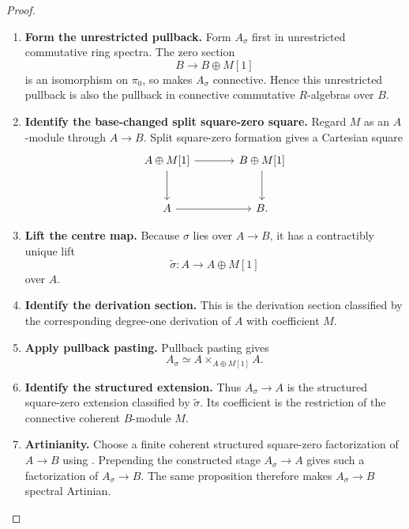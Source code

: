 \begin{proof}
\leavevmode
\begin{enumerate}[label=\textup{(\arabic*)}]
    \item \textbf{Form the unrestricted pullback.}
    Form \(A_\sigma\) first in unrestricted commutative ring spectra. The zero
    section
    \[
        B\longrightarrow B\oplus M[1]
    \]
    is an isomorphism on \(\pi_0\), so
     makes \(A_\sigma\) connective.
    Hence this unrestricted pullback is also the pullback in connective
    commutative \(R\)-algebras over \(B\).
    \item \textbf{Identify the base-changed split square-zero square.}
    Regard \(M\) as an \(A\)-module through \(A\to B\). Split square-zero
    formation gives a Cartesian square
    \[
    \begin{tikzcd}[column sep=large, row sep=large]
        A\oplus M[1] \arrow[r] \arrow[d]
            & B\oplus M[1] \arrow[d]
        \\
        A \arrow[r]
            & B.
    \end{tikzcd}
    \]
    \item \textbf{Lift the centre map.}
    Because \(\sigma\) lies over \(A\to B\), it has a contractibly unique lift
    \[
        \widetilde\sigma:A\longrightarrow A\oplus M[1]
    \]
    over \(A\).
    \item \textbf{Identify the derivation section.}
    This is the derivation section classified by the corresponding
    degree-one derivation of \(A\) with coefficient \(M\).
    \item \textbf{Apply pullback pasting.}
    Pullback pasting gives
    \[
        A_\sigma
        \simeq
        A\times_{A\oplus M[1]}A.
    \]
    \item \textbf{Identify the structured extension.}
    Thus \(A_\sigma\to A\) is the structured square-zero extension classified by
    \(\widetilde\sigma\). Its coefficient is the restriction of the connective
    coherent \(B\)-module \(M\).
    \item \textbf{Artinianity.}
    Choose a finite coherent structured square-zero factorization of
    \(A\to B\) using
    . Prepending the constructed
    stage \(A_\sigma\to A\) gives such a factorization of \(A_\sigma\to B\). The
    same proposition therefore makes \(A_\sigma\to B\) spectral Artinian.
\end{enumerate}
\end{proof}

